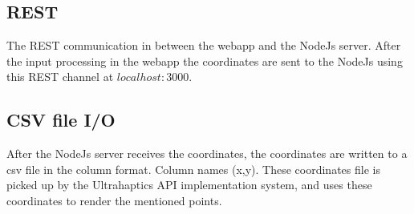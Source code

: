 \subsection*{REST}
The REST communication in between the webapp and the NodeJs server. After the input processing in the webapp the coordinates are sent to 
the NodeJs using this REST channel at $localhost:3000$.  
\subsection*{CSV file I/O}
After the NodeJs server receives the coordinates, the coordinates are written to a csv file in the column format. 
Column names (x,y). These coordinates file is picked up by the Ultrahaptics API implementation system, and uses these 
coordinates to render the mentioned points.


